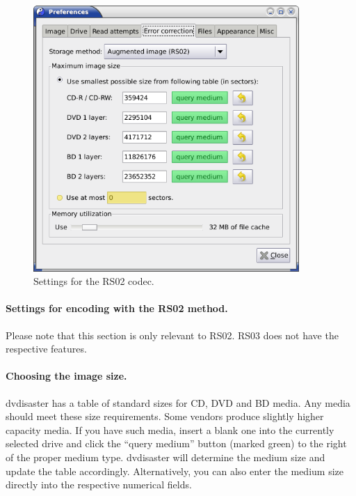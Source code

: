 \newpage
\begin{figure}[h]
\vspace*{-5mm}
\centerline{\includegraphics[width=0.9\textwidth]{screenshots/augment-prefs-rs02-adv.png}}
\caption{Settings for the RS02 codec.}  
\label{howto-augmented-settings-rs02-adv}
\end{figure}

\vspace*{-8mm}

\paragraph{Settings for encoding with the RS02 method.}\quad
\label{howto-augment-advanced-settings-rs02}

Please note that this section is only relevant to RS02.
RS03 does not have the respective features.

\paragraph{Choosing the image size.} dvdisaster has a table of
standard sizes for CD, DVD and BD media. Any media should meet
these size requirements. Some vendors produce slightly higher
capacity media. If you have such media, insert a blank one into
the currently selected drive and click the ``query medium'' button
(marked green) to the right of the proper medium type. dvdisaster
will determine the medium size and update the table accordingly.
Alternatively, you can also enter the medium size directly into the
respective numerical fields.

